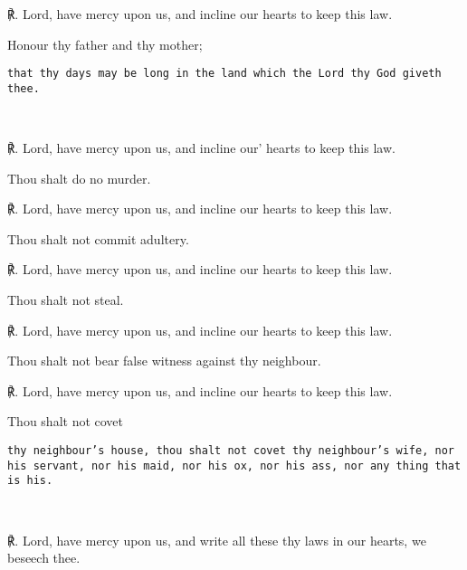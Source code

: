 	\par
    ℟. Lord, have mercy upon us, and incline our hearts to keep this law.\\
    \par\noindent
    Honour thy father and thy mother;\\
    \par\noindent
    \hfill\begin{minipage}{\dimexpr\textwidth-2cm}
    \noindent
	\texttt{{\footnotesize that thy days may be long in the land which the Lord thy God giveth thee.}}
	\end{minipage}\\
	\par
    ℟. Lord, have mercy upon us, and incline our’ hearts to keep this law.\\
    \par\noindent
    Thou shalt do no murder.\par
    ℟. Lord, have mercy upon us, and incline our hearts to keep this law.\\
    \par\noindent
    Thou shalt not commit adultery.\par
    ℟. Lord, have mercy upon us, and incline our hearts to keep this law.\\
\par\noindent
    Thou shalt not steal.\par
    ℟. Lord, have mercy upon us, and incline our hearts to keep this law.\\
\par\noindent
    Thou shalt not bear false witness against thy neighbour.\par
    ℟. Lord, have mercy upon us, and incline our hearts to keep this law.\\
    \par\noindent
    Thou shalt not covet\\
    \par\noindent
    \hfill\begin{minipage}{\dimexpr\textwidth-2cm}
    \noindent
	\texttt{{\footnotesize thy neighbour's house, thou shalt not covet thy neighbour's wife, nor his servant, nor his maid, nor his ox, nor his ass, nor any thing that is his.}}
	\end{minipage}\\
	\par
	℟. Lord, have mercy upon us, and write all these thy laws in our hearts, we beseech thee.